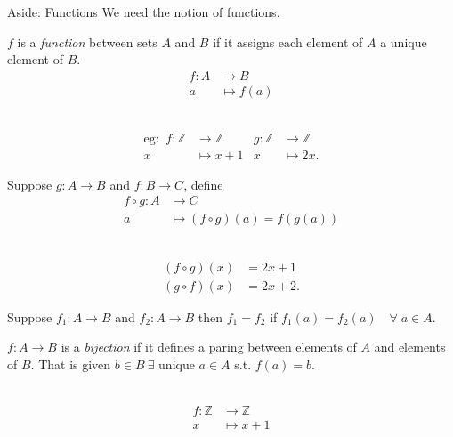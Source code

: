 \begin{aside}{Aside: Functions}
We need the notion of functions.
\begin{definition}[Function]
  \(f\) is a \emph{function} between sets \(A\) and \(B\) if it assigns each element of \(A\) a unique element of \(B\).
\begin{align*}
    f: A &\to B \\
    a &\mapsto f(a)
\end{align*}
\end{definition} 

\begin{example}  ~\vspace*{-1.5\baselineskip}
  \begin{align*}
    \text{eg: }\ f: \mathbb{Z} &\to \mathbb{Z} & g: \mathbb{Z} &\to \mathbb{Z} \\
    x &\mapsto x + 1 & x &\mapsto 2x.
  \end{align*}
\end{example} 

\begin{definition}
  Suppose \(g: A \to B\) and \(f: B \to C\), define
  \begin{align*}
    f \circ g: A &\to C \\
    a &\mapsto (f \circ g)(a) = f(g(a))
  \end{align*} 
\end{definition} 

\begin{example} ~\vspace*{-1.5\baselineskip}
  \begin{align*}
    (f \circ g)(x) &= 2x + 1 \\
    (g \circ f)(x) &= 2x + 2.
  \end{align*} 
\end{example} 

Suppose \(f_1: A \to B\) and \(f_2: A \to B\) then \(f_1 = f_2\) if \(f_1(a) = f_2(a) \quad \forall \; a \in A\).

\begin{definition}
  \(f: A \to B\) is a \emph{bijection} if it defines a paring between elements of \(A\) and elements of \(B\). That is given \(b \in B \ \exists\) unique \(a \in A\) s.t. \(f(a) = b\).
\end{definition} 

\begin{example}~
\vspace*{-1.5\baselineskip} %
  \begin{align*}
    f: \mathbb{Z} &\to \mathbb{Z} \\
    x &\mapsto x + 1
  \end{align*}
\end{example} 


\end{aside}
